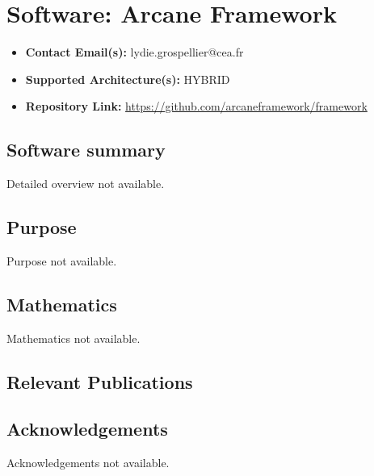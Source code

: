 \section{Software: Arcane Framework}
\label{sec:Arcane Framework:software}



\begin{itemize}
    \item \textbf{Contact Email(s):} lydie.grospellier@cea.fr
    \item \textbf{Supported Architecture(s):} HYBRID
    \item \textbf{Repository Link:} \href{https://github.com/arcaneframework/framework}{https://github.com/arcaneframework/framework}
\end{itemize}

\subsection{Software summary}
\label{sec:Arcane Framework:summary}
Detailed overview not available.



\subsection{Purpose}
\label{sec:Arcane Framework:purpose}
Purpose not available.



\subsection{Mathematics}
\label{sec:Arcane Framework:mathematics}
Mathematics not available.


\subsection{Relevant Publications}
\label{sec:Arcane Framework:publications}

\subsection{Acknowledgements}
\label{sec::Arcane Framework:acknowledgements}

Acknowledgements not available.


